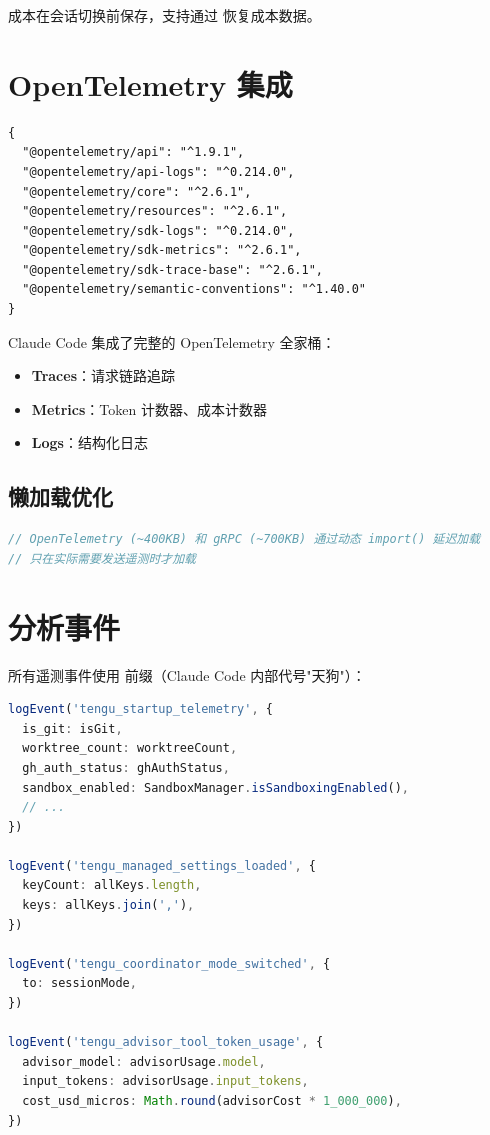 成本在会话切换前保存，支持通过  恢复成本数据。

\section{OpenTelemetry 集成}

\begin{lstlisting}[breaklines=true]
{
  "@opentelemetry/api": "^1.9.1",
  "@opentelemetry/api-logs": "^0.214.0",
  "@opentelemetry/core": "^2.6.1",
  "@opentelemetry/resources": "^2.6.1",
  "@opentelemetry/sdk-logs": "^0.214.0",
  "@opentelemetry/sdk-metrics": "^2.6.1",
  "@opentelemetry/sdk-trace-base": "^2.6.1",
  "@opentelemetry/semantic-conventions": "^1.40.0"
}
\end{lstlisting}

Claude Code 集成了完整的 OpenTelemetry 全家桶：
\begin{itemize}[nosep]
  \item \textbf{Traces}：请求链路追踪
  \item \textbf{Metrics}：Token 计数器、成本计数器
  \item \textbf{Logs}：结构化日志
\end{itemize}

\subsection{懒加载优化}

\begin{lstlisting}[language=TypeScript,breaklines=true]
// OpenTelemetry (~400KB) 和 gRPC (~700KB) 通过动态 import() 延迟加载
// 只在实际需要发送遥测时才加载
\end{lstlisting}

\section{分析事件}

所有遥测事件使用  前缀（Claude Code 内部代号"天狗"）：

\begin{lstlisting}[language=TypeScript,breaklines=true]
logEvent('tengu_startup_telemetry', {
  is_git: isGit,
  worktree_count: worktreeCount,
  gh_auth_status: ghAuthStatus,
  sandbox_enabled: SandboxManager.isSandboxingEnabled(),
  // ...
})

logEvent('tengu_managed_settings_loaded', {
  keyCount: allKeys.length,
  keys: allKeys.join(','),
})

logEvent('tengu_coordinator_mode_switched', {
  to: sessionMode,
})

logEvent('tengu_advisor_tool_token_usage', {
  advisor_model: advisorUsage.model,
  input_tokens: advisorUsage.input_tokens,
  cost_usd_micros: Math.round(advisorCost * 1_000_000),
})
\end{lstlisting}

